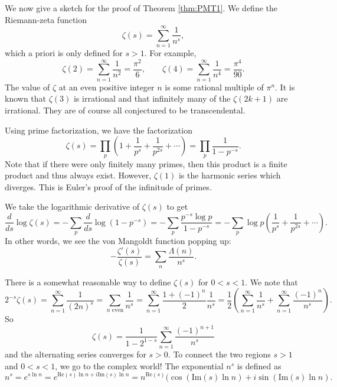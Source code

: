 \documentclass{article}
\begin{document}
\vspace{5pt}
We now give a sketch for the proof of Theorem \ref{thm:PMT1}. We define the Riemann-zeta function
$$\zeta(s) = \sum_{n=1}^\infty \frac{1}{n^s},$$
which a priori is only defined for $s>1$. For example,
$$\zeta(2) = \sum_{n=1}^\infty\frac{1}{n^2} = \frac{\pi^2}{6},\qquad \zeta(4) = \sum_{n=1}^\infty\frac{1}{n^4} =  \frac{\pi^4}{90}.$$
The value of $\zeta$ at an even positive integer $n$ is some rational multiple of $\pi^n$. It is known that $\zeta(3)$ is irrational and that infinitely many of the $\zeta(2k+1)$ are irrational. They are of course all conjectured to be transcendental.

\vspace{5pt}
Using prime factorization, we have the factorization
$$\zeta(s) = \prod_p \left(1 + \frac{1}{p^s} + \frac{1}{p^{2s}} + \cdots\right) = \prod_p \frac{1}{1-p^{-s}}.$$
Note that if there were only finitely many primes, then this product is a finite product and thus always exist. However, $\zeta(1)$ is the harmonic series which diverges. This is Euler's proof of the infinitude of primes.

\vspace{5pt}
We take the logarithmic derivative of $\zeta(s)$ to get
$$\frac{d}{ds}\log\zeta(s) = - \sum_p \frac{d}{ds}\log(1 - p^{-s}) = -\sum_p \frac{p^{-s}\log p}{1-p^{-s}} = -\sum_p \log p\left(\frac{1}{p^s} + \frac{1}{p^{2s}} + \cdots\right).$$
In other words, we see the von Mangoldt function popping up: $$-\frac{\zeta'(s)}{\zeta(s)} = \sum_n \frac{\Lambda(n)}{n^s}.$$

There is a somewhat reasonable way to define $\zeta(s)$ for $0<s<1$. We note that
$$2^{-s}\zeta(s) = \sum_{n=1}^\infty\frac{1}{(2n)^s} = \sum_{n\text{ even}}\frac{1}{n^s} = \sum_{n=1}^\infty \frac{1+(-1)^n}{2}\frac{1}{n^s} = \frac{1}{2}\left(\sum_{n=1}^\infty\frac{1}{n^s}+\sum_{n=1}^\infty\frac{(-1)^n}{n^s}  \right).$$
So $$\zeta(s) = \frac{1}{1-2^{1-s}}\sum_{n=1}^\infty\frac{(-1)^{n+1}}{n^s}$$
and the alternating series converges for $s>0$. To connect the two regions $s>1$ and $0<s<1$, we go to the complex world! The exponential $n^s$ is defined as
$$n^s = e^{s\ln n} = e^{\text{Re}(s)\ln n + i\text{Im}(s)\ln n} = n^{\text{Re}(s)}(\cos(\text{Im}(s)\ln n) + i\sin(\text{Im}(s)\ln n).$$
\end{document}
